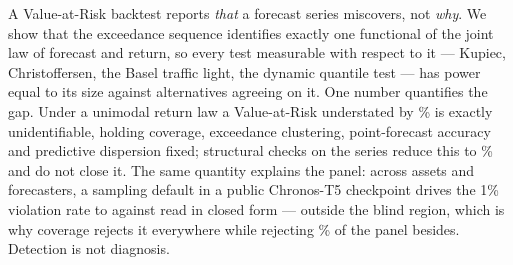 A Value-at-Risk backtest reports \emph{that} a forecast series miscovers, not
\emph{why}. We show that the exceedance sequence identifies exactly one
functional of the joint law of forecast and return, so every test measurable with
respect to it --- Kupiec, Christoffersen, the Basel traffic light, the dynamic
quantile test --- has power equal to its size against alternatives agreeing on
it. One number quantifies the gap. Under a unimodal return law a Value-at-Risk
understated by \nGapUndUni\% is exactly unidentifiable, holding coverage,
exceedance clustering, point-forecast accuracy and predictive dispersion fixed;
structural checks on the series reduce this to \nGapUndGateNow\% and do not close
it. The same quantity explains the panel: across \nMainAssets{} assets and
\nMainForecasters{} forecasters, a sampling default in a public Chronos-T5
checkpoint drives the 1\% violation rate to \nPiSmallDefaultOne{} against
\nPiSmallAnalyticOne{} read in closed form --- outside the blind region, which is
why coverage rejects it everywhere while rejecting \nSeqKupiecRejRawOne\% of the
panel besides. Detection is not diagnosis.
